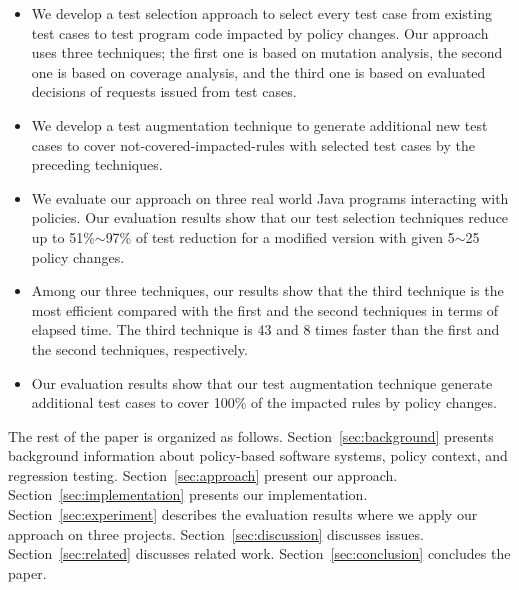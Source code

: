 \begin{itemize}
  \item We develop a test selection approach to select every test case from existing test cases to test program code impacted by policy changes. Our approach
  uses three techniques; the first one is based on mutation analysis, the second one is based on coverage analysis, and the third one is based on evaluated 
decisions of requests issued from test cases. 
  \item We develop a test augmentation technique to generate additional new test cases to cover not-covered-impacted-rules with selected test cases by the preceding techniques.

  \item  We evaluate our approach on three real world Java programs interacting with policies. Our evaluation results show that our test selection techniques reduce up to 51\%$\sim$97\% of test reduction for a modified version with given 5$\sim$25 policy changes.
  

  \item  Among our three techniques, our results show that the third technique is the most efficient compared with the first
  and the second techniques in terms of elapsed time. The third technique is 43 and 8 times
faster than the first and the second techniques, respectively.
  
  \item    Our evaluation results show that our test augmentation technique generate additional test cases to cover 100\% of the impacted rules by policy changes.
\end{itemize}

The rest of the paper is organized as follows.
Section~\ref{sec:background} presents background information about
policy-based software systems, policy context, and regression testing.
Section~\ref{sec:approach} present our approach.
Section~\ref{sec:implementation} presents our implementation. 
Section~\ref{sec:experiment} describes the evaluation results
where we apply our approach on three projects.
Section~\ref{sec:discussion} discusses issues. 
Section~\ref{sec:related} discusses related
work. Section~\ref{sec:conclusion}
concludes the paper.